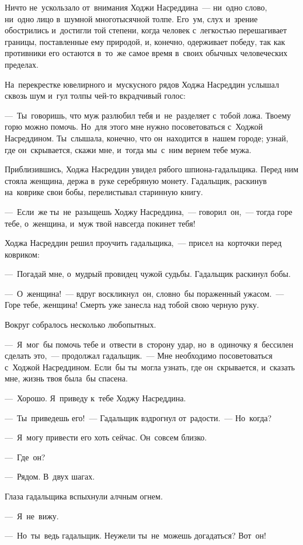 \documentclass[12pt,a4paper]{book}
\begin{document}
Ничто не~ускользало от~внимания Ходжи Насреддина~— ни~одно слово, ни~одно лицо в~шумной многотысячной толпе. Его~ум, слух и~зрение обострились и~достигли той степени, когда человек с~легкостью перешагивает границы, поставленные ему природой, и, конечно, одерживает победу, так как противники его остаются в~то~же самое время в~своих обычных человеческих пределах.

На~перекрестке ювелирного и~мускусного рядов Ходжа Насреддин услышал сквозь шум и~гул толпы чей-то вкрадчивый голос:

—~Ты~говоришь, что муж разлюбил тебя и~не~разделяет с~тобой ложа. Твоему горю можно помочь. Но~для этого мне нужно посоветоваться с~Ходжой Насреддином. Ты~слышала, конечно, что он~находится в~нашем городе; узнай, где он~скрывается, скажи мне, и~тогда мы~с~ним вернем тебе мужа.

Приблизившись, Ходжа Насреддин увидел рябого шпиона-гадальщика. Перед ним стояла женщина, держа в~руке серебряную монету. Гадальщик, раскинув на~коврике свои бобы, перелистывал старинную книгу.

—~Если~же ты~не~разыщешь Ходжу Насреддина,~— говорил~он,~— тогда горе тебе, о~женщина, и~муж твой навсегда покинет тебя!

Ходжа Насреддин решил проучить гадальщика,~— присел на~корточки перед ковриком:

—~Погадай мне, о~мудрый провидец чужой судьбы. Гадальщик раскинул бобы.

—~О~женщина!~— вдруг воскликнул~он, словно~бы пораженный ужасом.~— Горе тебе, женщина! Смерть уже занесла над тобой свою черную руку.

Вокруг собралось несколько любопытных.

—~Я~мог~бы помочь тебе и~отвести в~сторону удар, но~в~одиночку я~бессилен сделать это,~— продолжал гадальщик.~— Мне необходимо посоветоваться с~Ходжой Насреддином. Если~бы ты~могла узнать, где он~скрывается, и~сказать мне, жизнь твоя была~бы спасена.

—~Хорошо. Я~приведу к~тебе Ходжу Насреддина.

—~Ты~приведешь его!~— Гадальщик вздрогнул от~радости.~— Но~когда?

—~Я~могу привести его хоть сейчас. Он~совсем близко.

—~Где~он?

—~Рядом. В~двух шагах.

Глаза гадальщика вспыхнули алчным огнем.

—~Я~не~вижу.

—~Но~ты~ведь гадальщик. Неужели ты~не~можешь догадаться? Вот~он!
\end{document}
